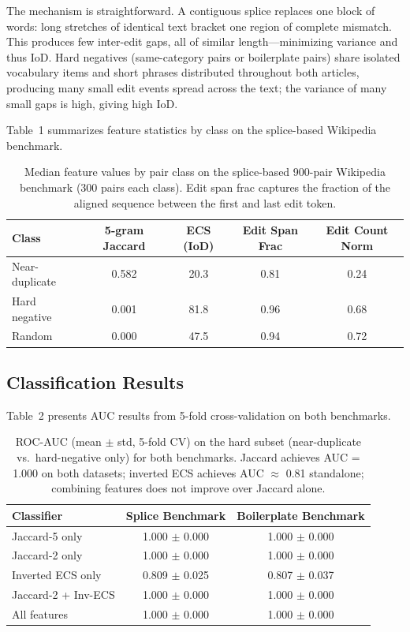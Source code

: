 \documentclass[11pt,letterpaper]{article}
\begin{document}
The mechanism is straightforward. A contiguous splice replaces one block of words: long stretches of identical text bracket one region of complete mismatch. This produces few inter-edit gaps, all of similar length---minimizing variance and thus IoD. Hard negatives (same-category pairs or boilerplate pairs) share isolated vocabulary items and short phrases distributed throughout both articles, producing many small edit events spread across the text; the variance of many small gaps is high, giving high IoD.

Table~1 summarizes feature statistics by class on the splice-based Wikipedia benchmark.

\begin{table}[h]
\centering
\caption{Median feature values by pair class on the splice-based 900-pair Wikipedia benchmark (300 pairs each class). Edit span frac captures the fraction of the aligned sequence between the first and last edit token.}
\begin{tabular}{lcccc}
\toprule
Class & 5-gram Jaccard & ECS (IoD) & Edit Span Frac & Edit Count Norm \\
\midrule
Near-duplicate & 0.582 & 20.3 & 0.81 & 0.24 \\
Hard negative & 0.001 & 81.8 & 0.96 & 0.68 \\
Random & 0.000 & 47.5 & 0.94 & 0.72 \\
\bottomrule
\end{tabular}
\end{table}

\subsection{Classification Results}

Table~2 presents AUC results from 5-fold cross-validation on both benchmarks.

\begin{table}[h]
\centering
\caption{ROC-AUC (mean $\pm$ std, 5-fold CV) on the hard subset (near-duplicate vs.\ hard-negative only) for both benchmarks. Jaccard achieves AUC = 1.000 on both datasets; inverted ECS achieves AUC $\approx$ 0.81 standalone; combining features does not improve over Jaccard alone.}
\begin{tabular}{lcc}
\toprule
Classifier & Splice Benchmark & Boilerplate Benchmark \\
\midrule
Jaccard-5 only & 1.000 $\pm$ 0.000 & 1.000 $\pm$ 0.000 \\
Jaccard-2 only & 1.000 $\pm$ 0.000 & 1.000 $\pm$ 0.000 \\
Inverted ECS only & 0.809 $\pm$ 0.025 & 0.807 $\pm$ 0.037 \\
Jaccard-2 + Inv-ECS & 1.000 $\pm$ 0.000 & 1.000 $\pm$ 0.000 \\
All features & 1.000 $\pm$ 0.000 & 1.000 $\pm$ 0.000 \\
\bottomrule
\end{tabular}
\end{table}
\end{document}
